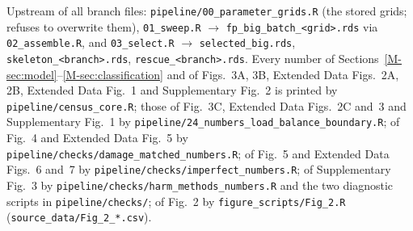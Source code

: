 \documentclass[11pt]{article}
\begin{document}
Upstream of all branch files: \texttt{pipeline/00\_parameter\_grids.R} (the stored grids;
refuses to overwrite them), \texttt{01\_sweep.R} $\to$ \texttt{fp\_big\_batch\_<grid>.rds}
via \texttt{02\_assemble.R}, and \texttt{03\_select.R} $\to$ \texttt{selected\_big.rds},
\texttt{skeleton\_<branch>.rds}, \texttt{rescue\_<branch>.rds}. Every number of
Sections~\ref{M-sec:model}--\ref{M-sec:classification} and of
Figs.~3A, 3B, Extended Data Figs.~2A, 2B, Extended Data Fig.~1 and Supplementary Fig.~2 is printed by \texttt{pipeline/census\_core.R};
those of Fig.~3C, Extended Data Figs.~2C and~3 and Supplementary Fig.~1 by \texttt{pipeline/24\_numbers\_load\_balance\_boundary.R}; of Fig.~4
and Extended Data Fig.~5 by \texttt{pipeline/checks/damage\_matched\_numbers.R}; of Fig.~5 and Extended Data Figs.~6 and~7 by \texttt{pipeline/checks/imperfect\_numbers.R}; of Supplementary Fig.~3 by
\texttt{pipeline/checks/harm\_methods\_numbers.R} and the two diagnostic scripts in
\texttt{pipeline/checks/}; of Fig.~2 by \texttt{figure\_scripts/Fig\_2.R}
(\texttt{source\_data/Fig\_2\_*.csv}).
\end{document}
